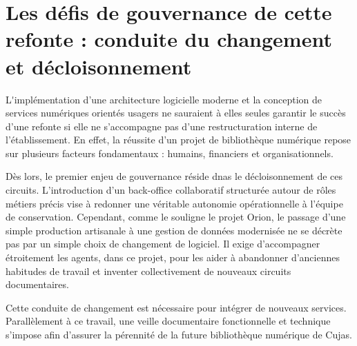 \chapter[Les défis de gouvernance de cette refonte]{Les défis de gouvernance de cette refonte : conduite du changement et décloisonnement}

\lettrine{L}'implémentation d'une architecture logicielle moderne et la conception de services numériques orientés usagers ne sauraient à elles seules garantir le succès d'une refonte si elle ne s'accompagne pas d'une restructuration interne de l'établissement. En effet, la réussite d'un projet de bibliothèque numérique repose sur plusieurs facteurs fondamentaux : humains, financiers et organisationnels.

Dès lors, le premier enjeu de gouvernance réside dnas le décloisonnement de ces circuits. L'introduction d'un back-office collaboratif structurée autour de rôles métiers précis vise à redonner une véritable autonomie opérationnelle à l'équipe de conservation. Cependant, comme le souligne le projet Orion, le passage d'une simple production artisanale à une gestion de données modernisée ne se décrète pas par un simple choix de changement de logiciel. Il exige d'accompagner étroitement les agents, dans ce projet, pour les aider à abandonner d'anciennes habitudes de travail et inventer collectivement de nouveaux circuits documentaires. 

Cette conduite de changement est nécessaire pour intégrer de nouveaux services. Parallèlement à ce travail, une veille documentaire fonctionnelle et technique s'impose afin d'assurer la pérennité de la future bibliothèque numérique de Cujas.

